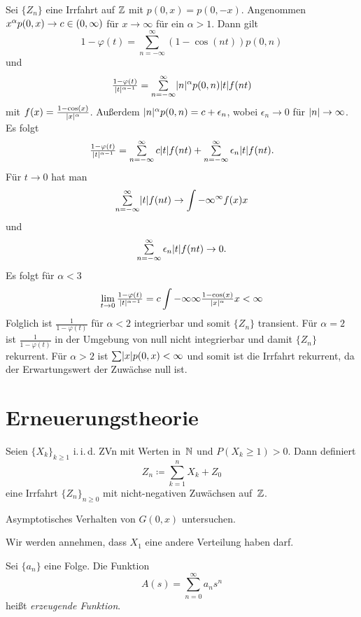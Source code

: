 \documentclass{cheat-sheet}
\newcommand{\iid}{i.\,i.\,d.} %
\begin{document}
\begin{bsp}
  Sei $\{ Z_n \}$ eine Irrfahrt auf $\mathbb{Z}$ mit $p(0, x) = p(0, -x)$.
  Angenommen $x^\alpha p(0, x) \to c \in \left( 0, \infty \right)$ für $x \to \infty$ für ein $\alpha > 1$.
  Dann gilt
  \[ 1 - \varphi(t) = \sum_{n=-\infty}^\infty (1 - \cos(nt)) p(0, n) \]
  und
  \[
    \tfrac{1 - \varphi(t)}{\abs{t}^{\alpha - 1}} = \sum_{n=-\infty}^\infty \abs{n}^\alpha p(0, n) \abs{t} f(n t)
  \]
  mit $f(x) = \tfrac{1 - \cos(x)}{\lvert x\rvert^\alpha}$.
  Außerdem $\lvert n\rvert^\alpha p(0, n) = c + \epsilon_n$, wobei $\epsilon_n \to 0$ für $\lvert n\rvert \to \infty$.
  Es folgt
  \[
    \tfrac{1 - \varphi(t)}{\abs{t}^{\alpha - 1}} = \sum_{n=-\infty}^\infty c \abs{t} f(n t) + \sum_{n=-\infty}^\infty \epsilon_n \abs{t} f(n t).
  \]
  Für $t \to 0$ hat man
  \[ \sum_{n=-\infty}^\infty \abs{t} f(n t) \to \int{-\infty}^{\infty}{f(x)}{x} \]
  und
  \[ \sum_{n=-\infty}^\infty \epsilon_n \abs{t} f(n t) \to 0. \]
  Es folgt für $\alpha < 3$
  \[ \lim_{t \to 0} \tfrac{1 - \varphi(t)}{\lvert t\rvert^{\alpha - 1}} = c \int{-\infty}{\infty}{\tfrac{1 - \cos(x)}{\lvert x\rvert^\alpha}}{x} < \infty \]
  Folglich ist $\tfrac{1}{1 - \varphi(t)}$ für $\alpha < 2$ integrierbar und somit $\{ Z_n \}$ transient.
  Für $\alpha = 2$ ist $\tfrac{1}{1 - \varphi(t)}$ in der Umgebung von null nicht integrierbar und damit $\{ Z_n \}$ rekurrent.
  Für $\alpha > 2$ ist $\sum \abs{x} p(0, x) < \infty$ und somit ist die Irrfahrt rekurrent, da der Erwartungswert der Zuwächse null ist.
\end{bsp}


\section{Erneuerungstheorie}

\begin{situation}
  Seien $\{ X_k \}_{k \geq 1}$ \iid{} ZVn mit Werten in~$\mathbb{N}$ und $P(X_k \geq 1) > 0$.
  Dann definiert
  \[
  Z_n \coloneqq \sum_{k=1}^n X_k + Z_0
  \]
  eine Irrfahrt $\{ Z_n \}_{n \geq 0}$ mit nicht-negativen Zuwächsen auf~$\mathbb{Z}$.
\end{situation}

\begin{ziel}
  Asymptotisches Verhalten von $G(0, x)$ untersuchen.
\end{ziel}

Wir werden annehmen, dass $X_1$ eine andere Verteilung haben darf.

\begin{defn}
  Sei $\{ a_n \}$ eine Folge.
  Die Funktion
  \[ A(s) = \sum_{n=0}^\infty a_n s^n \]
  heißt \emph{erzeugende Funktion}.
\end{defn}
\end{document}
